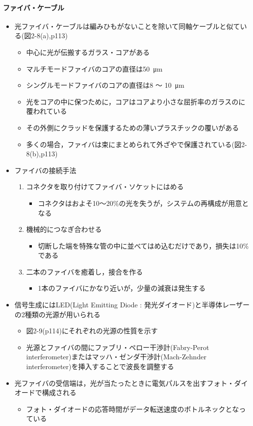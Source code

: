 \documentclass[a4paper]{ltjsarticle}
\begin{document}
			\paragraph{ファイバ・ケーブル}
				\begin{itemize}
					\item 光ファイバ・ケーブルは編みひもがないことを除いて同軸ケーブルと似ている(図2-8(a),p113)
					\begin{itemize}
						\item 中心に光が伝搬するガラス・コアがある
						\item マルチモードファイバのコアの直径は\SI{50}{\micro m}
						\item シングルモードファイバのコアの直径は8 ～ \SI{10}{\micro m}
						\item 光をコアの中に保つために，コアはコアより小さな屈折率のガラスのに覆われている
						\item その外側にクラッドを保護するための薄いプラスチックの覆いがある
						\item 多くの場合，ファイバは束にまとめられて外ざやで保護されている(図2-8(b),p113)
					\end{itemize}
					\item ファイバの接続手法
					\begin{enumerate}
						\item コネクタを取り付けてファイバ・ソケットにはめる
						\begin{itemize}
							\item コネクタはおよそ10～20\%の光を失うが，システムの再構成が用意となる
						\end{itemize}
						\item 機械的につなぎ合わせる
						\begin{itemize}
							\item 切断した端を特殊な管の中に並べてはめ込むだけであり，損失は10\%である
						\end{itemize}
						\item 二本のファイバを癒着し，接合を作る
						\begin{itemize}
							\item 1本のファイバにかなり近いが，少量の減衰は発生する
						\end{itemize}
					\end{enumerate}
					\item 信号生成にはLED(Light Emitting Diode : 発光ダイオード)と半導体レーザーの2種類の光源が用いられる
					\begin{itemize}
						\item 図2-9(p114)にそれぞれの光源の性質を示す
						\item 光源とファイバの間にファブリ・ペロー干渉計(Fabry-Perot interferometer)またはマッハ・ゼンダ干渉計(Mach-Zehnder interferometer)を挿入することで波長を調整する
					\end{itemize}
					\item 光ファイバの受信端は，光が当たったときに電気パルスを出すフォト・ダイオードで構成される
					\begin{itemize}
						\item フォト・ダイオードの応答時間がデータ転送速度のボトルネックとなっている
					\end{itemize}
				\end{itemize}
\end{document}

